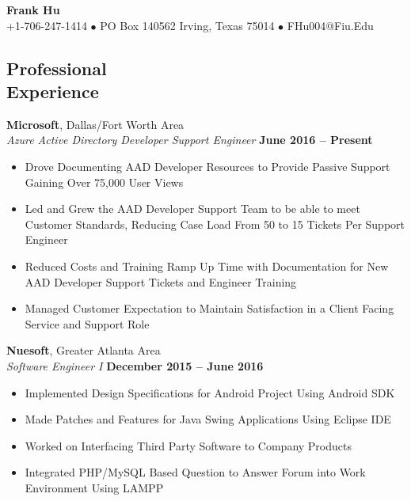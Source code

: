 \documentclass[margin,line]{resume}
\begin{document}
	{\centering \LARGE{\textbf{Frank Hu}}}
	\\
	\normalsize
	+1-706-247-1414 $\bullet$ PO Box 140562 Irving, Texas 75014 $\bullet$ FHu004@Fiu.Edu
	
	\begin{resume}
	
		
	\section{\mysidestyle Professional\\Experience}
	
	\textbf{Microsoft}, Dallas/Fort Worth Area \vspace{1mm}\\\vspace{1mm}
	\textsl{Azure Active Directory Developer Support Engineer} \hfill \textbf{June 2016 -- Present}
	\begin{itemize}
		 \item Drove Documenting AAD Developer Resources to Provide Passive Support Gaining Over 75,000 User Views	
		 \item Led and Grew the AAD Developer Support Team to be able to meet Customer Standards, Reducing Case Load From 50 to 15 Tickets Per Support Engineer 
		 \item Reduced Costs and Training Ramp Up Time with Documentation for New AAD Developer Support Tickets and Engineer Training 
		\item Managed Customer Expectation to Maintain Satisfaction in a Client
		Facing Service and Support Role
	
	\end{itemize}

	\textbf{Nuesoft}, Greater Atlanta Area \vspace{1mm}\\\vspace{1mm}%
	\textsl{Software Engineer I} \hfill \textbf{December 2015 -- June 2016}
	\begin{itemize}
	 	\item Implemented Design Specifications for Android Project Using Android SDK
	 	\item Made Patches and Features for Java Swing Applications Using Eclipse IDE 
	 	\item Worked on Interfacing Third Party Software to Company Products
	 	\item Integrated PHP/MySQL Based Question to Answer Forum into Work Environment Using LAMPP
	\end{itemize}
	

\end{resume}
\end{document}
